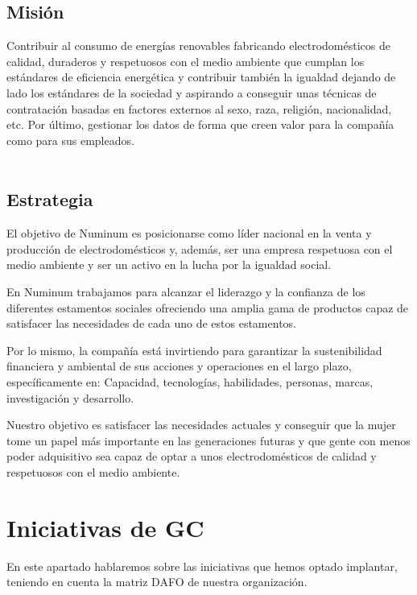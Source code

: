\documentclass[twoside]{article}
\begin{document}
\subsection{Misión}
\label{sec:mision}

Contribuir al consumo de energías renovables fabricando electrodomésticos de calidad, duraderos y respetuosos con el medio ambiente que cumplan los estándares de eficiencia energética y contribuir también la igualdad dejando de lado los estándares de la sociedad y aspirando a conseguir unas técnicas de contratación basadas en factores externos al sexo, raza, religión, nacionalidad, etc. Por último, gestionar los datos de forma que creen valor para la compañía como para sus empleados.
%
\\
\\

\subsection{Estrategia}

El objetivo de Numinum es posicionarse como líder nacional en la venta y producción de electrodomésticos y, además, ser una empresa respetuosa con el medio ambiente y ser un activo en la lucha por la igualdad social.

En Numinum trabajamos para alcanzar el liderazgo y la confianza de los diferentes estamentos sociales ofreciendo una amplia gama de productos capaz de satisfacer las necesidades de cada uno de estos estamentos.

Por lo mismo, la compañía está invirtiendo para garantizar la sustenibilidad financiera y ambiental de sus acciones y operaciones en el largo plazo, específicamente en: Capacidad, tecnologías, habilidades, personas, marcas, investigación y desarrollo.

Nuestro objetivo es satisfacer las necesidades actuales y conseguir que la mujer tome un papel más importante en las generaciones futuras y que gente con menos poder adquisitivo sea capaz de optar a unos electrodomésticos de calidad y respetuosos con el medio ambiente.
\newpage


\section{Iniciativas de GC}
En este apartado hablaremos sobre las iniciativas que hemos optado implantar, teniendo en cuenta la matriz DAFO de nuestra organización.
\end{document}
